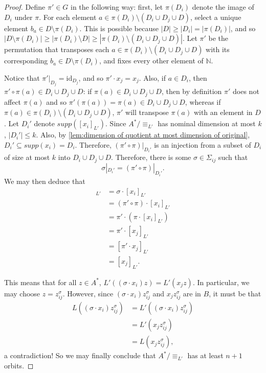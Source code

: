 \documentclass[runningheads]{llncs}
\newcommand{\bb}{\mathbb}
\begin{document}
\begin{proof}
    Define $\pi' \in G$ in the following way: first, let $\pi(D_i)$ denote the image of $D_i$ under $\pi$.
    For each element $a \in \pi(D_i) \setminus (D_i \cup D_j \cup D)$, select a unique element $b_a \in D \setminus \pi(D_i)$.
    This is possible because $|D| \geq |D_i| = |\pi(D_i)|$, and so $|D \setminus \pi(D_i)| \geq |\pi(D_i) \setminus D| \geq |\pi(D_i) \setminus (D_i \cup D_j \cup D)|$. 
    Let $\pi'$ be the permutation that transposes each $a \in \pi(D_i) \setminus (D_i \cup D_j \cup D)$ with its corresponding $b_a \in D \setminus \pi(D_i)$, and fixes every other element of $\bb N$. 

    Notice that $\pi'|_{D_j} = \mathrm{id}_{D_j}$, and so $\pi' \cdot x_j = x_j$. 
    Also, if $a \in D_i$, then $\pi' \circ \pi(a) \in D_i \cup D_j \cup D$: if $\pi(a) \in D_i \cup D_j \cup D$, then by definition $\pi'$ does not affect $\pi(a)$ and so $\pi'(\pi(a)) = \pi(a) \in D_i \cup D_j \cup D$, whereas if $\pi(a) \in \pi(D_i) \setminus (D_i \cup D_j \cup D)$, $\pi'$ will transpose $\pi(a)$ with an element in $D$. 
    Let $D_i'$ denote $supp([x_i]_{L'})$.
    Since $A^* / \equiv_{L'}$ has nominal dimension at most $k$, $|D_i'| \leq k$.
    Also, by \autoref{lem:dimension of quotient at most dimension of original}, $D_i' \subseteq supp(x_i) = D_i$.
    Therefore, $(\pi' \circ \pi)|_{D_i'}$ is an injection from a subset of $D_i$ of size at most $k$ into $D_i \cup D_j \cup D$. 
    Therefore, there is some $\sigma \in \Sigma_{ij}$ such that
    \[
        \sigma|_{D_i'} = (\pi' \circ \pi)|_{D_i'}.
    \]
    We may then deduce that 
    \begin{align*}
        [\sigma \cdot x_i]_{L'} &= \sigma \cdot [x_i]_{L'} \\
        &= (\pi' \circ \pi) \cdot [x_i]_{L'} \\
        &= \pi' \cdot (\pi \cdot [x_i]_{L'}) \\
        &= \pi' \cdot [x_j]_{L'} \\
        &= [\pi' \cdot x_j]_{L'} \\
        &= [x_j]_{L'}.
    \end{align*}

    This means that for all $z \in A^*$, $L'((\sigma \cdot x_i) z) = L'(x_j z)$.
    In particular, we may choose $z = z^\sigma_{ij}$.
    However, since $(\sigma \cdot x_i) z^\sigma_{ij}$ and $x_j z^\sigma_{ij}$ are in $B$, it must be that
    \begin{align*}
        L((\sigma \cdot x_i) z^\sigma_{ij}) &= L'((\sigma \cdot x_i) z^\sigma_{ij}) \\
        &= L'(x_j z^\sigma_{ij}) \\
        &= L(x_j z^\sigma_{ij}),
    \end{align*}
    a contradiction!
    So we may finally conclude that $A^* / \equiv_{L'}$ has at least $n+1$ orbits.    
\end{proof}
\end{document}
